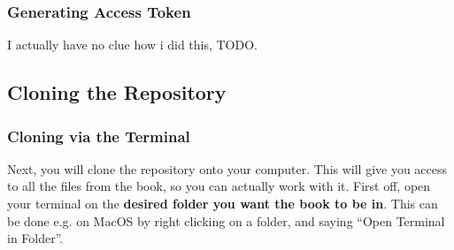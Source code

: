 \documentclass{article}
\begin{document}
    \subsubsection{Generating Access Token}
    I actually have no clue how i did this, TODO.

    \subsection{Cloning the Repository}

    \subsubsection{Cloning via the Terminal}

    Next, you will clone the repository onto your computer.
    This will give you access to all the files from the book, so you can actually work with it.
    First off, open your terminal on the \textbf{desired folder you want the book to be in}.
    This can be done e.g. on MacOS by right clicking on a folder, and saying ``Open Terminal in Folder''.
\end{document}
